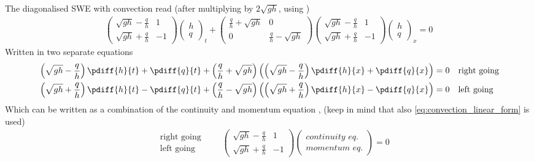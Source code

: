 The diagonalised  SWE with convection read (after multiplying by $2\sqrt{gh}$, using  \maplesoft)
\begin{align}
    \begin{pmatrix} \sqrt{gh} - \frac{q}{h} & 1  \\ \sqrt{gh} + \frac{q}{h} & -1 \end{pmatrix}
    \begin{pmatrix} h \\ q \end{pmatrix}_t +
    \begin{pmatrix} \frac{q}{h} + \sqrt{gh}   & 0  \\
        0 & \frac{q}{h} - \sqrt{gh}  \end{pmatrix}
    \begin{pmatrix} \sqrt{gh} - \frac{q}{h} & 1  \\ \sqrt{gh} + \frac{q}{h} & -1 \end{pmatrix}
    \begin{pmatrix} h \\ q \end{pmatrix}_x = 0
\end{align}
%
Written in two separate equations
\begin{align}
    &\left(\sqrt{gh} - \frac{q}{h}\right)\pdiff{h}{t} + \pdiff{q}{t} +  \left( \frac{q}{h} + \sqrt{gh}\right)\left( \left(\sqrt{gh} - \frac{q}{h} \right)\pdiff{h}{x} + \pdiff{q}{x} \right) = 0 \quad \text{right going}
    \\
    &\left(\sqrt{gh} + \frac{q}{h}\right)\pdiff{h}{t} - \pdiff{q}{t} +  \left( \frac{q}{h} - \sqrt{gh}\right)\left( \left(\sqrt{gh} + \frac{q}{h} \right)\pdiff{h}{x} - \pdiff{q}{x} \right) = 0 \quad \text{left going}
\end{align}
Which can be written as a combination of the continuity and momentum equation \citep[eq.\ 4]{Borsboom2001}, (keep in mind that also \autoref{eq:convection_linear_form} is used)
\begin{align}
    \begin{matrix}
    \quad \text{right going} \\
    \quad \text{left going}
\end{matrix}
\qquad
    \begin{pmatrix}
        \sqrt{gh} - \frac{q}{h}  &  1 \\
        \sqrt{gh} + \frac{q}{h}  &  -1
    \end{pmatrix}
    \begin{pmatrix} \textit{continuity eq.} \\ \textit{momentum eq.} \end{pmatrix}    = 0
    \label{eq:left_right_going_equations}
\end{align}
